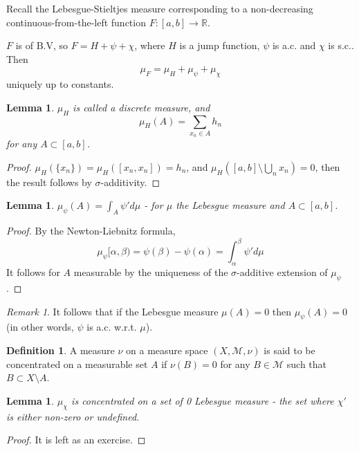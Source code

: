 \documentclass[11pt,a4paper]{report}
\newtheorem{lemma}[theorem]{Lemma}
\theoremstyle{plain}
\theoremstyle{definition}
\newtheorem*{defn}{Definition}
\theoremstyle{remark}
\newtheorem*{rem}{Remark}
\newcommand{\Union}{\bigcup}
\newcommand{\R}{\mathbb{R}}
\newcommand{\cM}{\mathcal{M}}
\begin{document}
Recall the Lebesgue-Stieltjes measure corresponding to a non-decreasing continuous-from-the-left function $F: [a, b] \to \R$.

$F$ is of B.V, so $F = H + \psi + \chi$, where $H$ is a jump function, $\psi$ is a.c. and $\chi$ is s.c.. Then
$$ \mu_F = \mu_H + \mu_\psi + \mu_\chi $$
uniquely up to constants.

\begin{lemma}
  $\mu_H$ is called a discrete measure, and
  $$ \mu_H(A) = \sum_{x_n \in A} h_n $$
  for any $A \subset [a, b]$.
\end{lemma}

\begin{proof}
  $\mu_H(\{x_n\}) = \mu_H([x_n, x_n]) = h_n$, and $\mu_H([a, b] \setminus \Union_n x_n) = 0$, then the result follows by $\sigma$-additivity.
\end{proof}

\begin{lemma}\label{psi_measure_is_psiderivative_integral}
  $\mu_\psi(A) = \int_A \psi' d\mu$ - for $\mu$ the Lebesgue measure and $A \subset [a, b]$.
\end{lemma}

\begin{proof}
  By the Newton-Liebnitz formula,
  $$ \mu_\psi[\alpha, \beta) = \psi(\beta) - \psi(\alpha) = \int_\alpha^\beta \psi' d\mu $$
  It follows for $A$ measurable by the uniqueness of the $\sigma$-additive extension of $\mu_\psi$.
\end{proof}

\begin{rem}
  It follows that if the Lebesgue measure $\mu(A) = 0$ then $\mu_\psi(A) = 0$ (in other words, $\psi$ is a.c. w.r.t. $\mu$).
\end{rem}

\begin{defn}
  A measure $\nu$ on a measure space $(X, \cM, \nu)$ is said to be concentrated on a measurable set $A$ if $\nu(B) = 0$ for any $B \in \cM$ such that $B \subset X \setminus A$.
\end{defn}

\begin{lemma}
  $\mu_\chi$ is concentrated on a set of 0 Lebesgue measure - the set where $\chi'$ is either non-zero or undefined.
\end{lemma}

\begin{proof}
  It is left as an exercise.
\end{proof}
\end{document}
